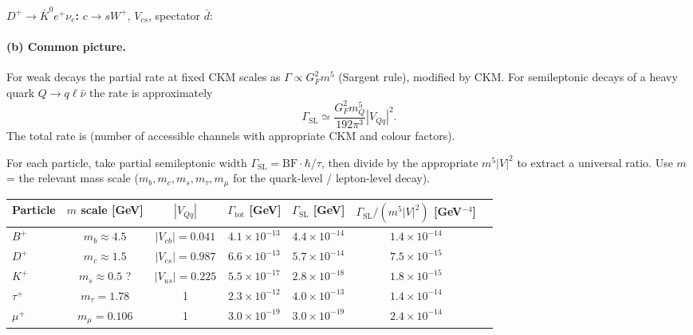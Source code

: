 \documentclass[11pt]{article}
\newcommand{\fphoton}[2]{\draw[decorate, decoration={snake, amplitude=0.6mm, segment length=2mm}] (#1) -- (#2);}
\begin{document}
\textbf{$D^+\to\bar K^0 e^+\nu_e$:} $c\to s W^+$, $V_{cs}$, spectator $\bar d$:
\begin{center}
\end{center}

\paragraph{(b) Common picture.} For weak decays the partial rate at fixed CKM scales as $\Gamma\propto G_F^{2}m^{5}$ (Sargent rule), modified by CKM. For semileptonic decays of a heavy quark $Q\to q\ell\bar\nu$ the rate is approximately
\[
\Gamma_\mathrm{SL}\simeq\frac{G_F^{2}m_Q^{5}}{192\pi^{3}}|V_{Qq}|^{2}.
\]
The total rate is (number of accessible channels with appropriate CKM and colour factors).

For each particle, take partial semileptonic width $\Gamma_\mathrm{SL}=\mathrm{BF}\cdot\hbar/\tau$, then divide by the appropriate $m^{5}|V|^{2}$ to extract a universal ratio. Use $m$ = the relevant mass scale ($m_b,m_c,m_s,m_\tau,m_\mu$ for the quark-level / lepton-level decay).

\begin{center}
\begin{tabular}{@{}lcccccc@{}}\hline
Particle & $m$ scale [GeV] & $|V_{Qq}|$ & $\Gamma_\mathrm{tot}$ [GeV] & $\Gamma_\mathrm{SL}$ [GeV] & $\Gamma_\mathrm{SL}/(m^{5}|V|^{2})$ [GeV$^{-4}$]\\\hline
$B^+$ & $m_b\approx 4.5$ & $|V_{cb}|=0.041$ & $4.1\times 10^{-13}$ & $4.4\times 10^{-14}$ & $1.4\times 10^{-14}$\\
$D^+$ & $m_c\approx 1.5$ & $|V_{cs}|=0.987$ & $6.6\times 10^{-13}$ & $5.7\times 10^{-14}$ & $7.5\times 10^{-15}$\\
$K^+$ & $m_s\approx 0.5$ ? & $|V_{us}|=0.225$ & $5.5\times 10^{-17}$ & $2.8\times 10^{-18}$ & $1.8\times 10^{-15}$\\
$\tau^+$& $m_\tau=1.78$ & 1 & $2.3\times 10^{-12}$ & $4.0\times 10^{-13}$ & $1.4\times 10^{-14}$\\
$\mu^+$ & $m_\mu=0.106$ & 1 & $3.0\times 10^{-19}$ & $3.0\times 10^{-19}$ & $2.4\times 10^{-14}$\\\hline
\end{tabular}
\end{center}
\end{document}
